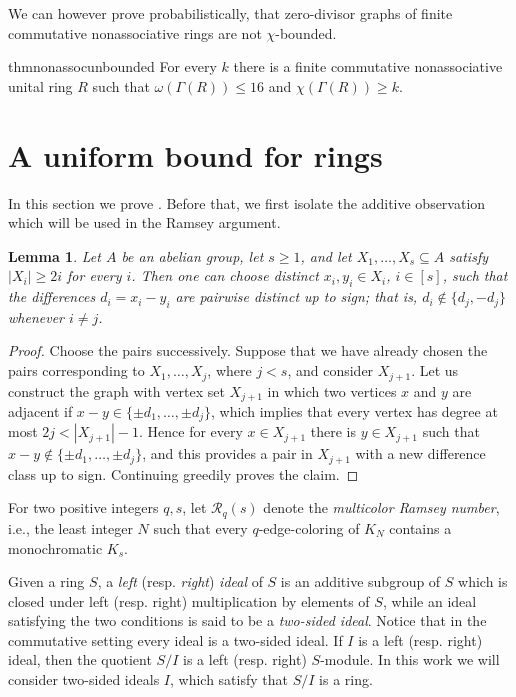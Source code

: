\documentclass[a4paper,11pt]{amsart}
\newtheorem{lem}[lem]{Lemma}
\theoremstyle{definition}
\begin{document}
We can however prove probabilistically, that zero-divisor graphs of finite commutative nonassociative rings are not $\chi$-bounded.

\begin{restatable}{thm}{nonassocunbounded}\label{thm:nonassoc-unbounded}
For every $k$ there is a finite commutative nonassociative unital ring $R$ such that $
 \omega(\Gamma(R))\le16$ and $\chi(\Gamma(R))\ge k$.
\end{restatable}

\section{A uniform bound for rings}
\label{sec:uniform-bound}

In this section we prove . Before that, we first isolate the additive
observation which will be used in the Ramsey argument.

\begin{lem}\label{lem:rainbow-differences}
Let $A$ be an abelian group, let $s\ge1$, and let
$X_1,\ldots,X_s\subseteq A$ satisfy $|X_i|\geq 2i$ for every $i$. Then one can
choose distinct $x_i,y_i\in X_i$, $i\in[s]$, such that the differences
$d_i=x_i-y_i$ are pairwise distinct up to sign; that is,
$d_i\notin\{d_j,-d_j\}$ whenever $i\ne j$.

\end{lem}

\begin{proof}
Choose the pairs successively. Suppose that we have already chosen the pairs corresponding to $X_1,\ldots,X_j$, where $j<s$, and consider $X_{j+1}$. Let us construct the graph with vertex set $X_{j+1}$ in which two vertices $x$ and $y$ are adjacent if $x-y\in\{\pm d_1,\dots,\pm d_j\}$, which implies that every vertex has degree at most $2j< |X_{j+1}|-1$. Hence for every $x\in X_{j+1}$ there is $y\in X_{j+1}$ such that $x-y\notin\{\pm d_1,\dots,\pm d_j\}$, and this provides a pair in $X_{j+1}$ with a new difference class up to sign. Continuing greedily proves the claim. 
\end{proof}


For two positive integers $q,s$, let $\mathcal R_q(s)$ denote the
\emph{multicolor Ramsey number}, i.e., the least integer $N$ such that every
$q$-edge-coloring of $K_N$ contains a monochromatic $K_s$. 

Given a ring $S$, a \textit{left} (resp. \textit{right}) \textit{ideal} of $S$ is an additive subgroup of $S$ which is closed under left (resp. right) multiplication by elements of $S$, while an ideal satisfying the two conditions is said to be a \textit{two-sided ideal}. Notice that in the commutative setting every ideal is a two-sided ideal. If $I$ is a left (resp. right) ideal, then the quotient $S/I$ is a left (resp. right) $S$-module. In this work we will consider two-sided ideals $I$, which satisfy that $S/I$ is a ring.
\end{document}
